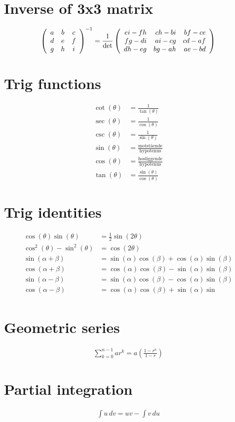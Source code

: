 
\section{Inverse of 3x3 matrix}
\begin{equation}
\left(\begin{array}{ccc}
    a & b & c\\
    d & e & f\\
    g & h &i
\end{array}\right)^{-1}
=
{\frac{1}{\rm{det}}}
\left(\begin{array}{rrr}
    e i - f h & c h - b i & b f - c e\\
    f g - d i & a i - c g & c d - a f\\
    d h - e g & b g - a h & a e - b d
\end{array}\right)
\end{equation}


\section{Trig functions}
\begin{align}
    \cot(\theta) &= \frac{1}{\tan(\theta)}\\
    \sec(\theta) &= \frac{1}{\cos(\theta)}\\
    \csc(\theta) &= \frac{1}{\sin(\theta)}\\
    \sin(\theta) &= \frac{\text{motstående}}{\text{hypotenus}}\\
    \cos(\theta) &= \frac{\text{hosliggende}}{\text{hypotenus}}\\
    \tan(\theta) &= \frac{\sin(\theta)}{\cos(\theta)}
\end{align}

\section{Trig identities}
\begin{align}
    \cos(\theta)\sin(\theta) &= \frac{1}{2}\sin(2\theta)\\
    \cos^2(\theta)-\sin^2(\theta) &= \cos(2\theta)\\
    \sin(\alpha+\beta) &= \sin(\alpha)\cos(\beta) + \cos(\alpha)\sin(\beta)\\
    \cos(\alpha+\beta) &= \cos(\alpha)\cos(\beta) - \sin(\alpha)\sin(\beta)\\
    \sin(\alpha-\beta) &= \sin(\alpha)\cos(\beta) - \cos(\alpha)\sin(\beta)\\
    \cos(\alpha-\beta) &= \cos(\alpha)\cos(\beta) + \sin(\alpha)\sin\\
\end{align}

\section{Geometric series}
\begin{align}
\sum_{k=0}^{n-1} ar^k= a \left(\frac{1-r^{n}}{1-r}\right)
\end{align}

\section{Partial integration}
\begin{align}
    \int u \, dv = uv - \int v \, du
\end{align}
